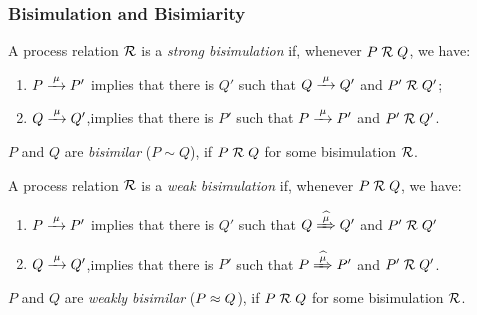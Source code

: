 \begin{frame}
\frametitle{Bisimulation and Bisimiarity}
\begin{small}
\begin{definition}
A process relation ${{\cal R}}$ is a \emph{strong bisimulation} if, whenever
 $P\mathrel{\cal R} Q$, we have:
\begin{enumerate}
\item $P \arr\mu P'$ implies that there is $Q'$ such that $Q \arr \mu Q'$ and $P' \mathrel{\cal R} Q'$;
\item $Q \arr\mu Q'$,implies that there is $P'$ such that $P \arr \mu P'$ and $P' \mathrel{\cal R} Q'$\enspace.
\end{enumerate}  
 $P$ and $Q$ are \emph{bisimilar} ($P \sim Q$), if $P \mathrel{\cal R} Q$ for some bisimulation ${\cal R}$.
\end{definition}
\begin{definition}
A process relation ${{\cal R}}$ is a \emph{weak bisimulation} if, whenever
 $P\mathrel{\cal R} Q$, we have:
\begin{enumerate}
\item $P \arr\mu P'$ implies that there is $Q'$ such that $Q \Arcap \mu Q'$ and $P' \mathrel{\cal R} Q'$%
\item $Q \arr\mu Q'$,implies that there is $P'$ such that $P \Arcap
  \mu P'$ and $P' \mathrel{\cal R} Q'$\enspace.
\end{enumerate}  
 $P$ and $Q$ are \emph{weakly bisimilar} ($P \approx Q$), if $P \mathrel{\cal R} Q$ for some bisimulation ${\cal R}$.
\end{definition}
\end{small}
\end{frame}

